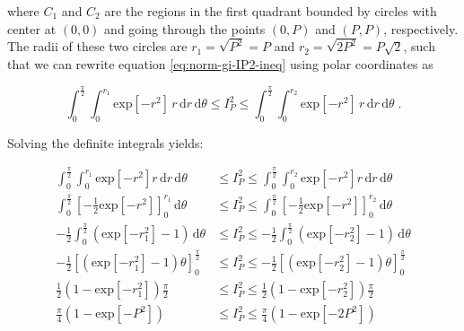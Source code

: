 \documentclass[a4paper,12pt,twoside]{book}
\begin{document}
where $C_1$ and $C_2$ are the regions in the first quadrant bounded by circles with center at $(0,0)$ and going through the points $(0,P)$ and $(P,P)$, respectively. The radii of these two circles are $r_1 = \sqrt{P^2} = P$ and $r_2 = \sqrt{2 P^2} = P \sqrt{2}$, such that we can rewrite equation \eqref{eq:norm-gi-IP2-ineq} using polar coordinates as

\begin{equation} \label{eq:norm-gi-IP2-ineq-PC}
\int_{0}^{\frac{\pi}{2}} \int_{0}^{r_1} \mathrm{exp}\left[ -r^2 \right] \, r \, \mathrm{d}r \, \mathrm{d}\theta \leq I_P^2 \leq \int_{0}^{\frac{\pi}{2}} \int_{0}^{r_2} \mathrm{exp}\left[ -r^2 \right] \, r \, \mathrm{d}r \, \mathrm{d}\theta \; .
\end{equation}

Solving the definite integrals yields:

\begin{equation} \label{eq:norm-gi-IP2-ineq-PC-int}
\begin{split}
\int_{0}^{\frac{\pi}{2}} \int_{0}^{r_1} \mathrm{exp}\left[ -r^2 \right] r \, \mathrm{d}r \, \mathrm{d}\theta &\leq I_P^2 \leq \int_{0}^{\frac{\pi}{2}} \int_{0}^{r_2} \mathrm{exp}\left[ -r^2 \right] r \, \mathrm{d}r \, \mathrm{d}\theta \\
\int_{0}^{\frac{\pi}{2}} \left[ -\frac{1}{2} \mathrm{exp}\left[ -r^2 \right] \right]_{0}^{r_1} \, \mathrm{d}\theta &\leq I_P^2 \leq \int_{0}^{\frac{\pi}{2}} \left[ -\frac{1}{2} \mathrm{exp}\left[ -r^2 \right] \right]_{0}^{r_2} \, \mathrm{d}\theta \\
-\frac{1}{2} \int_{0}^{\frac{\pi}{2}} \left( \mathrm{exp}\left[ -r_1^2 \right] - 1 \right) \, \mathrm{d}\theta &\leq I_P^2 \leq -\frac{1}{2} \int_{0}^{\frac{\pi}{2}} \left( \mathrm{exp}\left[ -r_2^2 \right] - 1 \right) \, \mathrm{d}\theta \\
-\frac{1}{2} \left[ \left( \mathrm{exp}\left[ -r_1^2 \right] - 1 \right) \theta \right]_{0}^{\frac{\pi}{2}} &\leq I_P^2 \leq -\frac{1}{2} \left[ \left( \mathrm{exp}\left[ -r_2^2 \right] - 1 \right) \theta \right]_{0}^{\frac{\pi}{2}} \\
\frac{1}{2} \left( 1 - \mathrm{exp}\left[ -r_1^2 \right] \right) \frac{\pi}{2} &\leq I_P^2 \leq \frac{1}{2} \left( 1 - \mathrm{exp}\left[ -r_2^2 \right] \right) \frac{\pi}{2} \\
\frac{\pi}{4} \left( 1 - \mathrm{exp}\left[ -P^2 \right] \right) &\leq I_P^2 \leq \frac{\pi}{4} \left( 1 - \mathrm{exp}\left[ -2 P^2 \right] \right)
\end{split}
\end{equation}
\end{document}
